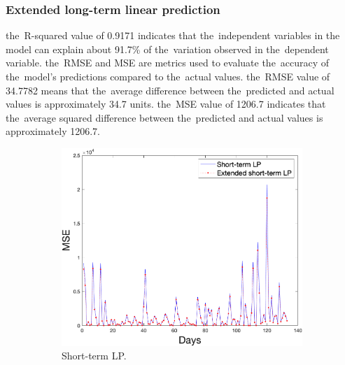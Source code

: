    \subsubsection{Extended long-term linear prediction} \label{subsec:res_eltlp}
     the~R-squared value of 0.9171 indicates that the~independent variables in the
    model can explain about 91.7\% of the~variation observed in the~dependent variable.
     the~RMSE and MSE are metrics used to evaluate the~accuracy of the~model's predictions
    compared to the~actual values. the~RMSE value of 34.7782 means that the~average difference
    between the~predicted and actual values is approximately 34.7 units. the~MSE value of
    1206.7 indicates that the~average squared difference between the~predicted and actual
    values is approximately 1206.7.\\
    \begin{figure}[!ht]
        \centering
        \begin{subfigure}[b]{0.4\textwidth}
            \includegraphics[width=1\textwidth]{figures/mseLP.png}
            \caption{Short-term LP.}
            \label{fig:mselp}
        \end{subfigure}
        \hspace{0.1\textwidth}
        \begin{subfigure}[b]{0.4\textwidth}

\end{subfigure}
\end{figure}
